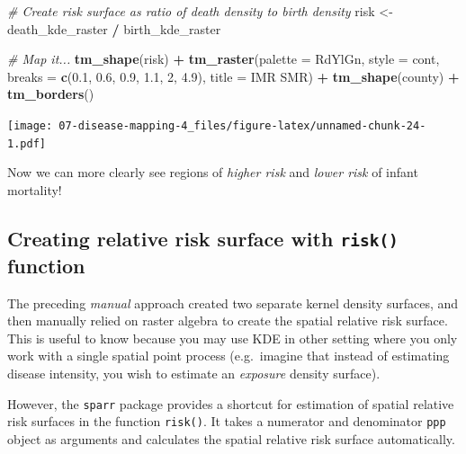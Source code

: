 \documentclass[
]{book}
\newenvironment{Shaded}{\begin{snugshade}}{\end{snugshade}}
\newcommand{\AttributeTok}[1]{\textcolor[rgb]{0.13,0.29,0.53}{#1}}
\newcommand{\CommentTok}[1]{\textcolor[rgb]{0.56,0.35,0.01}{\textit{#1}}}
\newcommand{\DecValTok}[1]{\textcolor[rgb]{0.00,0.00,0.81}{#1}}
\newcommand{\FloatTok}[1]{\textcolor[rgb]{0.00,0.00,0.81}{#1}}
\newcommand{\FunctionTok}[1]{\textcolor[rgb]{0.13,0.29,0.53}{\textbf{#1}}}
\newcommand{\NormalTok}[1]{#1}
\newcommand{\OtherTok}[1]{\textcolor[rgb]{0.56,0.35,0.01}{#1}}
\newcommand{\SpecialCharTok}[1]{\textcolor[rgb]{0.81,0.36,0.00}{\textbf{#1}}}
\newcommand{\StringTok}[1]{\textcolor[rgb]{0.31,0.60,0.02}{#1}}
\begin{document}
\begin{Shaded}
\begin{Highlighting}[]
\CommentTok{\# Create risk surface as ratio of death density to birth density}
\NormalTok{risk }\OtherTok{\textless{}{-}}\NormalTok{ death\_kde\_raster }\SpecialCharTok{/}\NormalTok{ birth\_kde\_raster}

\CommentTok{\# Map it...}
\FunctionTok{tm\_shape}\NormalTok{(risk) }\SpecialCharTok{+} 
  \FunctionTok{tm\_raster}\NormalTok{(}\AttributeTok{palette =} \StringTok{\textquotesingle{}{-}RdYlGn\textquotesingle{}}\NormalTok{,}
            \AttributeTok{style =} \StringTok{\textquotesingle{}cont\textquotesingle{}}\NormalTok{,}
            \AttributeTok{breaks =} \FunctionTok{c}\NormalTok{(}\FloatTok{0.1}\NormalTok{, }\FloatTok{0.6}\NormalTok{, }\FloatTok{0.9}\NormalTok{,   }\FloatTok{1.1}\NormalTok{, }\DecValTok{2}\NormalTok{, }\FloatTok{4.9}\NormalTok{),}
            \AttributeTok{title =} \StringTok{\textquotesingle{}IMR SMR\textquotesingle{}}\NormalTok{)  }\SpecialCharTok{+}
\FunctionTok{tm\_shape}\NormalTok{(county) }\SpecialCharTok{+}
  \FunctionTok{tm\_borders}\NormalTok{()}
\end{Highlighting}
\end{Shaded}

\texttt{[image: 07-disease-mapping-4\_files/figure-latex/unnamed-chunk-24-1.pdf]}

Now we can more clearly see regions of \emph{higher risk} and \emph{lower risk} of infant mortality!

\hypertarget{creating-relative-risk-surface-with-risk-function}{%
\subsection{\texorpdfstring{Creating relative risk surface with \texttt{risk()} function}{Creating relative risk surface with risk() function}}\label{creating-relative-risk-surface-with-risk-function}}

The preceding \emph{manual} approach created two separate kernel density surfaces, and then manually relied on raster algebra to create the spatial relative risk surface. This is useful to know because you may use KDE in other setting where you only work with a single spatial point process (e.g.~imagine that instead of estimating disease intensity, you wish to estimate an \emph{exposure} density surface).

However, the \texttt{sparr} package provides a shortcut for estimation of spatial relative risk surfaces in the function \texttt{risk()}. It takes a numerator and denominator \texttt{ppp} object as arguments and calculates the spatial relative risk surface automatically.
\end{document}
